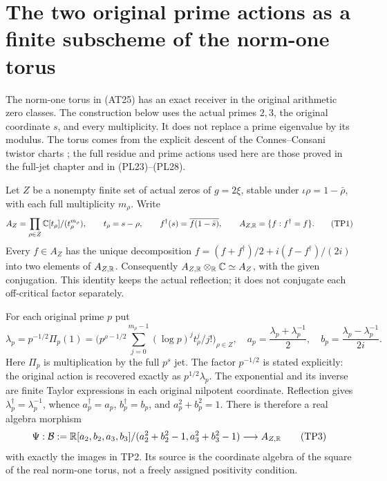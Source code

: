 \section{The two original prime actions as a finite subscheme of the norm-one torus}
\label{sec:two-prime-torus}

The norm-one torus in (AT25) has an exact receiver in the original
arithmetic zero classes. The construction below uses the actual primes
$2,3$, the original coordinate $s$, and every multiplicity. It does not
replace a prime eigenvalue by its modulus. The torus comes from the
explicit descent of the Connes--Consani twistor charts
\cite{ConnesConsaniTwistor}; the full residue and prime actions used here
are those proved in the full-jet chapter and in (PL23)--(PL28).

Let $Z$ be a nonempty finite set of actual zeros of $g=2\xi$, stable
under $\iota\rho=1-\bar\rho$, with each full multiplicity $m_\rho$.
Write
\[
 A_Z=\prod_{\rho\in Z}\mathbb C[t_\rho]/(t_\rho^{m_\rho}),
 \qquad t_\rho=s-\rho,
 \qquad f^\dagger(s)=\overline{f(1-\bar s)},
 \qquad A_{Z,\mathbb R}=\{f:f^\dagger=f\}.
 \tag{TP1}\label{tp:algebra}
\]
Every $f\in A_Z$ has the unique decomposition
$f=(f+f^\dagger)/2+i(f-f^\dagger)/(2i)$ into two elements of
$A_{Z,\mathbb R}$. Consequently $A_{Z,\mathbb R}\otimes_\mathbb R\mathbb C\simeq A_Z$,
with the given conjugation. This identity keeps the actual reflection;
it does not conjugate each off-critical factor separately.

For each original prime $p$ put
\[
 \lambda_p=p^{-1/2}\Pi_p(1)
 =\bigl(p^{\rho-1/2}\sum_{j=0}^{m_\rho-1}
       (\log p)^jt_\rho^j/j!\bigr)_{\rho\in Z},
 \quad
 a_p=\frac{\lambda_p+\lambda_p^{-1}}2,
 \quad b_p=\frac{\lambda_p-\lambda_p^{-1}}{2i}.
 \tag{TP2}\label{tp:coordinates}
\]
Here $\Pi_p$ is multiplication by the full $p^s$ jet. The factor
$p^{-1/2}$ is stated explicitly: the original action is recovered
exactly as $p^{1/2}\lambda_p$. The exponential and its inverse are
finite Taylor expressions in each original nilpotent coordinate.
Reflection gives $\lambda_p^\dagger=\lambda_p^{-1}$, whence
$a_p^\dagger=a_p$, $b_p^\dagger=b_p$, and $a_p^2+b_p^2=1$.
There is therefore a real algebra morphism
\[
 \Psi:\mathcal B:=
 \mathbb R[a_2,b_2,a_3,b_3]/(a_2^2+b_2^2-1,a_3^2+b_3^2-1)
 \longrightarrow A_{Z,\mathbb R}
 \tag{TP3}\label{tp:map}
\]
with exactly the images in TP2. Its source is the coordinate algebra
of the square of the real norm-one torus, not a freely assigned
positivity condition.

